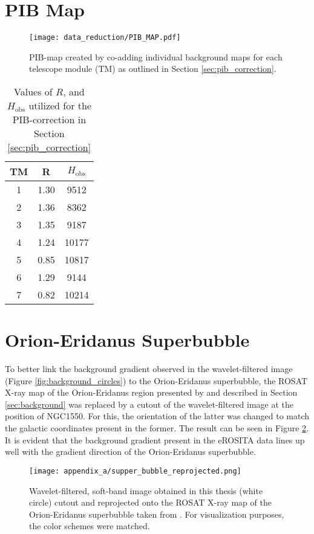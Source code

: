 \section{PIB Map}\label{sec:appendix_a_pib_map}
\begin{figure}[htbp]
    \centering
    \texttt{[image: data\_reduction/PIB\_MAP.pdf]}
    \caption[PIB-map.]{PIB-map created by co-adding individual background maps for each telescope module (TM) as outlined in Section \ref{sec:pib_correction}.}
    \label{fig:pib_map}
\end{figure}
\begin{table}[htbp]
    \centering
    \begin{tabular}{ccc}
        \toprule
        TM & R & $H_\text{obs}$ \\ 
        \midrule
        1 & 1.30 & 9512 \\
        2 & 1.36 & 8362 \\
        3 & 1.35 & 9187 \\
        4 & 1.24 & 10177 \\
        5 & 0.85 & 10817 \\
        6 & 1.29 & 9144 \\
        7 & 0.82 & 10214 \\
        \bottomrule
    \end{tabular}
    \caption{Values of \(R\), and $H_\text{obs}$ utilized for the PIB-correction in Section \ref{sec:pib_correction}}
    \label{tab:values_of_R_and_H}
\end{table}
%
\clearpage
\section{Orion-Eridanus Superbubble}\label{sec:orion}
To better link the background gradient observed in the wavelet-filtered image (Figure \ref{fig:background_circles}) to the Orion-Eridanus superbubble, the ROSAT X-ray map of the Orion-Eridanus region presented by \citet{Krause_2014} and described in Section \ref{sec:background} was replaced by a cutout of the wavelet-filtered image at the position of NGC1550. For this, the orientation of the latter was changed to match the galactic coordinates present in the former. The result can be seen in Figure \ref{fig:superbubble_reprojected}. It is evident that the background gradient present in the eROSITA data lines up well with the gradient direction of the Orion-Eridanus superbubble.
\begin{figure}[htbp]
    \centering
    \texttt{[image: appendix\_a/supper\_bubble\_reprojected.png]}
    \caption[Reprojection of Wavelet-filtered image onto ROSAT X-ray map.]{Wavelet-filtered, soft-band image obtained in this thesis (white circle) cutout and reprojected onto the ROSAT X-ray map of the Orion-Eridanus superbubble taken from \citet{Krause_2014}. For visualization purposes, the color schemes were matched.}
    \label{fig:superbubble_reprojected}
\end{figure}